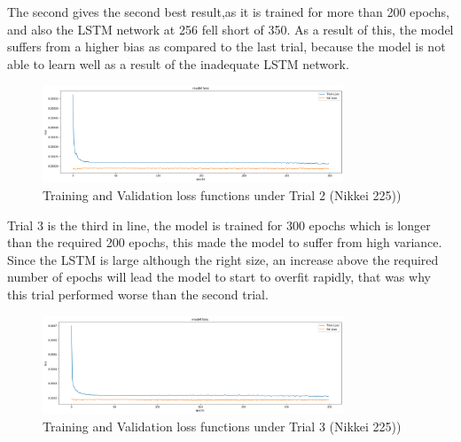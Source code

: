 \documentclass[a4paper,11pt,oneside]{book}
\begin{document}
 The second gives the second best result,as it is trained for more than 200 epochs, and
also the LSTM network at 256 fell short of 350. As a result of this, the model suffers from a higher bias as
compared to the last trial, because the model is not able to learn well as a result of the inadequate LSTM network.\newline\newline\newline\newline\newline\newline\newline\newline\newline\newline\newline
\begin{figure}[!h]
	\centering
	\includegraphics[width=0.8\textwidth]{figures/Nik2}
	\caption{Training and Validation loss functions under Trial 2 (Nikkei 225))}
	\label{Nik2}
\end{figure}

Trial 3 is the third in line, the model is trained for 300 epochs which is longer than the required 200 epochs,
this made the model to suffer from high variance. Since the LSTM is large although the right size, an increase
above the required number of epochs will lead the model to start to overfit rapidly, that was why this trial
performed worse than the second trial.\newline\newline
\begin{figure}[!h]
	\centering
	\includegraphics[width=0.8\textwidth]{figures/Nik3}
	\caption{Training and Validation loss functions under Trial 3 (Nikkei 225))}
	\label{Nik3}
\end{figure}
\end{document}
